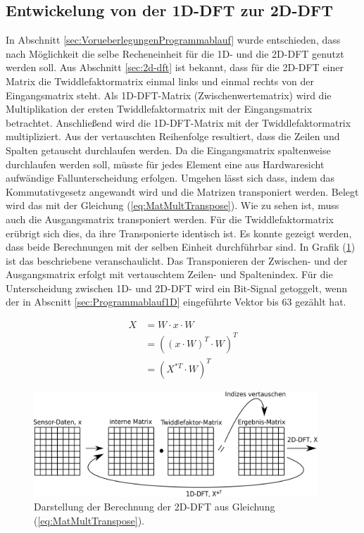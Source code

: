 \subsection{Entwickelung von der 1D-DFT zur 2D-DFT}
In Abschnitt \ref{sec:VorueberlegungenProgrammablauf} wurde entschieden, dass nach Möglichkeit die selbe Recheneinheit
für die 1D- und die 2D-DFT genutzt werden soll. 
Aus Abschnitt \ref{sec:2d-dft} ist bekannt, dass für die 2D-DFT einer Matrix die Twiddlefaktormatrix einmal links und einmal rechts von der Eingangsmatrix steht.
Als 1D-DFT-Matrix (Zwischenwertematrix) wird die Multiplikation der ersten Twiddlefaktormatrix mit der Eingangsmatrix betrachtet. Anschließend wird die 1D-DFT-Matrix mit der 
Twiddlefaktormatrix multipliziert. Aus der vertauschten Reihenfolge resultiert, dass die Zeilen und Spalten getauscht durchlaufen werden. 
Da die Eingangsmatrix spaltenweise durchlaufen werden soll, müsste  für jedes Element eine aus Hardwaresicht aufwändige Fallunterscheidung erfolgen.
Umgehen lässt sich dass, indem das Kommutativgesetz angewandt wird und die Matrizen transponiert werden. Belegt wird das mit der Gleichung (\ref{eq:MatMultTranspose}). Wie zu sehen ist, muss auch die Ausgangsmatrix transponiert werden. Für die Twiddlefaktormatrix erübrigt sich dies, da ihre Transponierte identisch ist.
Es konnte gezeigt werden, dass beide Berechnungen mit der selben Einheit durchführbar sind. In Grafik (\ref{pic:MatMultTranspose}) ist das beschriebene veranschaulicht.
Das Transponieren der Zwischen- und der Ausgangsmatrix erfolgt mit vertauschtem Zeilen- und Spaltenindex. 
Für die Unterscheidung zwischen 1D- und 2D-DFT wird ein Bit-Signal getoggelt, wenn der in Abscnitt \ref{sec:Programmablauf1D} eingeführte Vektor bis 63 gezählt hat.

\begin{align}
 X &= W \cdot x \cdot W \nonumber \\
   &= \left(\left(x\cdot W\right)^T\cdot W\right)^T \label{eq:MatMultTranspose}\\
   &= \left(X^{*T} \cdot W\right)^T \nonumber
\end{align}


\begin{figure}[htbp]
 \centering
 \includegraphics[width=0.95\textwidth]{img/MatMultTranspose2.png}
 \caption{Darstellung der Berechnung der 2D-DFT aus Gleichung (\ref{eq:MatMultTranspose}).}
 \label{pic:MatMultTranspose}
\end{figure}




